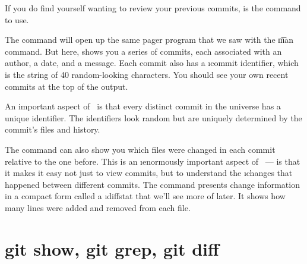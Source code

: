 \documentclass[letterpaper, 12pt, titlepage, twoside]{article}
\begin{document}
If you do find yourself wanting to review your previous commits, 
is the command to use.


The  command will open up the same pager program that we saw with the
\t{man} command. But here,  shows you a series of commits, each
associated with an author, a date, and a message. Each commit also has a
\i{commit identifier}, which is the string of 40 random-looking characters.
You should see your own recent commits at the top of the output.



An important aspect of \git\ is that every distinct commit in the universe has
a unique identifier. The identifiers look random but are uniquely determined
by the commit's files and history.


The  command can also show you which files were changed in each
commit relative to the one before. This is an \i{enormously} important aspect
of \git\ --- is that it makes it easy not just to view commits, but to
understand the \i{changes} that happened between different commits. The
 command presents change information in a compact form called a
\i{diffstat} that we'll see more of later. It shows how many lines were added
and removed from each file.




\section{git show, git grep, git diff}
\end{document}
